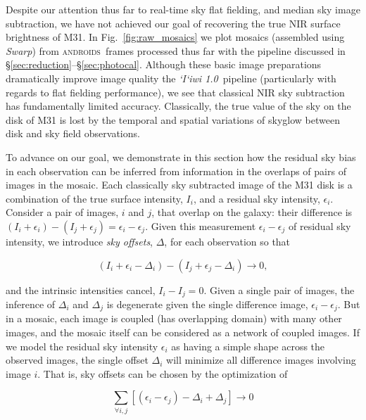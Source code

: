 \documentclass[iop]{emulateapj}
\newcommand{\sw}[1]{\textit{#1}} %
\newcommand{\iiwione}{\sw{`I`iwi 1.0}}
\newcommand{\androids}{\textsc{androids}}
\newcommand{\Fig}[1]{Fig.~\ref{fig:#1}}  %
\newcommand{\Sec}[1]{\S\ref{sec:#1}}  %
\begin{document}
Despite our attention thus far to real-time sky flat fielding, and median sky image subtraction, we have not achieved our goal of recovering the true NIR surface brightness of M31.
In \Fig{raw_mosaics} we plot mosaics (assembled using \sw{Swarp}) from \androids\ frames processed thus far with the pipeline discussed in \Sec{reduction}--\Sec{photocal}.
Although these basic image preparations dramatically improve image quality the \iiwione\ pipeline (particularly with regards to flat fielding performance), we see that classical NIR sky subtraction has fundamentally limited accuracy.
Classically, the true value of the sky on the disk of M31 is lost by the temporal and spatial variations of skyglow between disk and sky field observations.

To advance on our goal, we demonstrate in this section how the residual sky bias in each observation can be inferred from information in the overlaps of pairs of images in the mosaic.
Each classically sky subtracted image of the M31 disk is a combination of the true surface intensity, $I_i$, and a residual sky intensity, $\epsilon_i$.
Consider a pair of images, $i$ and $j$, that overlap on the galaxy: their difference is $(I_i+\epsilon_i) - (I_j+\epsilon_j) = \epsilon_i - \epsilon_j$.
Given this measurement $\epsilon_i - \epsilon_j$ of residual sky intensity, we introduce \emph{sky offsets}, $\Delta$, for each observation so that

\begin{equation}
    (I_i + \epsilon_i - \Delta_i) - (I_j + \epsilon_j - \Delta_i) \rightarrow 0,
\end{equation}

\noindent and the intrinsic intensities cancel, $I_i - I_j = 0$.
Given a single pair of images, the inference of $\Delta_i$ and $\Delta_j$ is degenerate given the single difference image, $\epsilon_i-\epsilon_j$.
But in a mosaic, each image is coupled (has overlapping domain) with many other images, and the mosaic itself can be considered as a network of coupled images.
If we model the residual sky intensity $\epsilon_i$ as having a simple shape across the observed images, the single offset $\Delta_i$ will minimize all difference images involving image $i$.
That is, sky offsets can be chosen by the optimization of

\begin{equation}
    \sum_{\forall i,j} [(\epsilon_i - \epsilon_j) - \Delta_i + \Delta_j] \rightarrow 0
    \label{eq:scalartheoryobj}
\end{equation}
\end{document}
